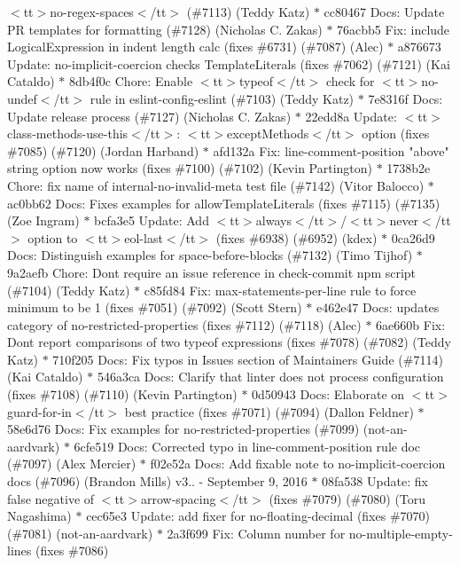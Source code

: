 \begin{DoxyItemize}
$<$tt$>$no-\/regex-\/spaces$<$/tt$>$ (\#7113) (\+Teddy Katz) \texorpdfstring{$\ast$}{*} cc80467 Docs\+: Update PR templates for formatting (\#7128) (\+Nicholas C. Zakas) \texorpdfstring{$\ast$}{*} 76acbb5 Fix\+: include Logical\+Expression in indent length calc  (fixes \#6731) (\#7087) (\+Alec) \texorpdfstring{$\ast$}{*} a876673 Update\+: no-\/implicit-\/coercion checks Template\+Literals (fixes \#7062) (\#7121) (\+Kai Cataldo) \texorpdfstring{$\ast$}{*} 8db4f0c Chore\+: Enable $<$tt$>$typeof$<$/tt$>$ check for $<$tt$>$no-\/undef$<$/tt$>$ rule in eslint-\/config-\/eslint (\#7103) (\+Teddy Katz) \texorpdfstring{$\ast$}{*} 7e8316f Docs\+: Update release process (\#7127) (\+Nicholas C. Zakas) \texorpdfstring{$\ast$}{*} 22edd8a Update\+: $<$tt$>$class-\/methods-\/use-\/this$<$/tt$>$\+: $<$tt$>$except\+Methods$<$/tt$>$ option (fixes \#7085) (\#7120) (\+Jordan Harband) \texorpdfstring{$\ast$}{*} afd132a Fix\+: line-\/comment-\/position "{}above"{} string option now works (fixes \#7100) (\#7102) (\+Kevin Partington) \texorpdfstring{$\ast$}{*} 1738b2e Chore\+: fix name of internal-\/no-\/invalid-\/meta test file (\#7142) (\+Vitor Balocco) \texorpdfstring{$\ast$}{*} ac0bb62 Docs\+: Fixes examples for allow\+Template\+Literals (fixes \#7115) (\#7135) (\+Zoe Ingram) \texorpdfstring{$\ast$}{*} bcfa3e5 Update\+: Add $<$tt$>$always$<$/tt$>$/$<$tt$>$never$<$/tt$>$ option to $<$tt$>$eol-\/last$<$/tt$>$ (fixes \#6938) (\#6952) (kdex) \texorpdfstring{$\ast$}{*} 0ca26d9 Docs\+: Distinguish examples for space-\/before-\/blocks (\#7132) (\+Timo Tijhof) \texorpdfstring{$\ast$}{*} 9a2aefb Chore\+: Don\textquotesingle{}t require an issue reference in check-\/commit npm script (\#7104) (\+Teddy Katz) \texorpdfstring{$\ast$}{*} c85fd84 Fix\+: max-\/statements-\/per-\/line rule to force minimum to be 1 (fixes \#7051) (\#7092) (\+Scott Stern) \texorpdfstring{$\ast$}{*} e462e47 Docs\+: updates category of no-\/restricted-\/properties (fixes \#7112) (\#7118) (\+Alec) \texorpdfstring{$\ast$}{*} 6ae660b Fix\+: Don\textquotesingle{}t report comparisons of two typeof expressions (fixes \#7078) (\#7082) (\+Teddy Katz) \texorpdfstring{$\ast$}{*} 710f205 Docs\+: Fix typos in Issues section of Maintainer\textquotesingle{}s Guide (\#7114) (\+Kai Cataldo) \texorpdfstring{$\ast$}{*} 546a3ca Docs\+: Clarify that linter does not process configuration (fixes \#7108) (\#7110) (\+Kevin Partington) \texorpdfstring{$\ast$}{*} 0d50943 Docs\+: Elaborate on $<$tt$>$guard-\/for-\/in$<$/tt$>$ best practice (fixes \#7071) (\#7094) (\+Dallon Feldner) \texorpdfstring{$\ast$}{*} 58e6d76 Docs\+: Fix examples for no-\/restricted-\/properties (\#7099) (not-\/an-\/aardvark) \texorpdfstring{$\ast$}{*} 6cfe519 Docs\+: Corrected typo in line-\/comment-\/position rule doc (\#7097) (\+Alex Mercier) \texorpdfstring{$\ast$}{*} f02e52a Docs\+: Add fixable note to no-\/implicit-\/coercion docs (\#7096) (\+Brandon Mills)  v3.. -\/ September 9, 2016  \texorpdfstring{$\ast$}{*} 08fa538 Update\+: fix false negative of $<$tt$>$arrow-\/spacing$<$/tt$>$ (fixes \#7079) (\#7080) (\+Toru Nagashima) \texorpdfstring{$\ast$}{*} cec65e3 Update\+: add fixer for no-\/floating-\/decimal (fixes \#7070) (\#7081) (not-\/an-\/aardvark) \texorpdfstring{$\ast$}{*} 2a3f699 Fix\+: Column number for no-\/multiple-\/empty-\/lines (fixes \#7086) 
\end{DoxyItemize}
